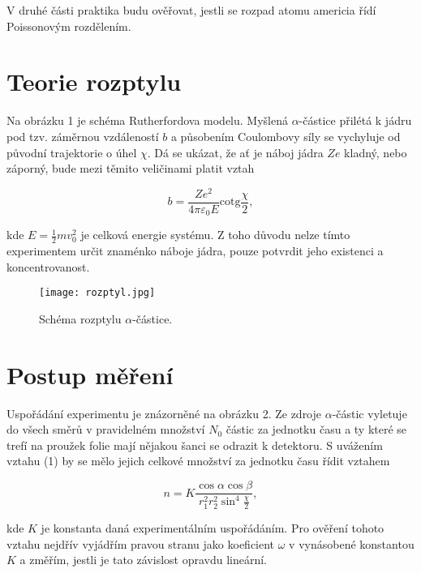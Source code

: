 \documentclass[a4paper,11pt]{article}
\begin{document}
V druhé části praktika budu ověřovat, jestli se rozpad atomu americia řídí Poissonovým rozdělením. 


\section{Teorie rozptylu}

Na obrázku 1 je schéma Rutherfordova modelu. Myšlená $ \alpha $-částice přilétá k jádru pod tzv. záměrnou vzdáleností $ b $ a působením Coulombovy síly se vychyluje od původní trajektorie o úhel $ \chi $. Dá se ukázat, že ať je náboj jádra $ Ze $  kladný, nebo záporný, bude mezi těmito veličinami platit vztah

\begin{equation}
 b = \frac{Z e^2}{4 \pi \varepsilon_0 E} \text{cotg} \frac{\chi}{2},
\end{equation}

\noindent
kde $ E = \frac{1}{2} m v_0^2 $ je celková energie systému. Z toho důvodu nelze tímto experimentem určit znaménko náboje jádra, pouze potvrdit jeho existenci a koncentrovanost.

\begin{figure}[htpb]
    \centering
    \texttt{[image: rozptyl.jpg]}
    \caption{Schéma rozptylu $ \alpha $-částice. }
\end{figure}

\section{Postup měření}

Uspořádání experimentu je znázorněné na obrázku 2. Ze zdroje $ \alpha $-částic vyletuje do všech směrů v pravidelném množství $ N_0 $ částic za jednotku času a ty které se trefí na proužek folie mají nějakou šanci se odrazit k detektoru. S uvážením vztahu (1) by se mělo jejich celkové množství za jednotku času řídit vztahem

\begin{equation}
n = K \frac{\cos \alpha \cos \beta}{r_1^2 r_2^2 \sin^{4} \frac{\chi}{2}},
\end{equation}

\noindent
kde $ K $ je konstanta daná experimentálním uspořádáním. Pro ověření tohoto vztahu nejdřív vyjádřím pravou stranu jako koeficient $ \omega $ v vynásobené konstantou $ K $ a změřím, jestli je tato závislost opravdu lineární.
\end{document}
